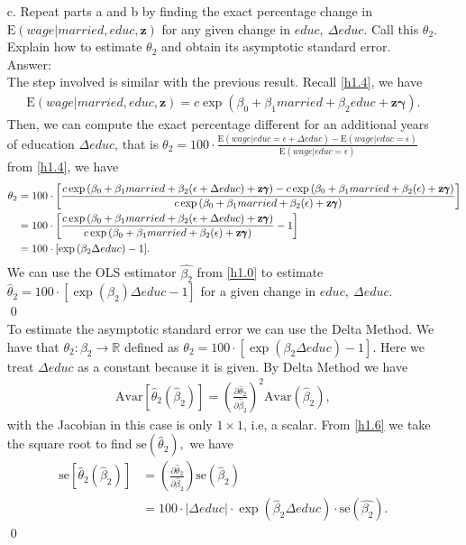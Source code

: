 \documentclass[10pt]{article}
\newcommand{\E}{\text{E}}
\newcommand{\Av}{\text{Avar}}
\newcommand{\se}{\text{se}}
\begin{document}
\begin{enumerate}
\item[c.] Repeat parts a and b by finding the exact percentage change in $\E(wage|married,educ,\mathbf{z})$ for any given change in $educ,\ \Delta educ.$ Call this $\theta_2.$ Explain how to estimate $\theta_2$ and obtain its asymptotic standard error.
\\ Answer:\\
The step involved is similar with the previous result. Recall \eqref{h1.4}, we have
\begin{align*}
    \E(wage|married,educ,\mathbf{z})=c\exp{(\beta_0+\beta_1 married +\beta_2 educ+\mathbf{z}\pmb{\gamma})}.
\end{align*}
Then, we can compute the exact percentage different for an additional years of education $\Delta educ$, that is $\theta_2=100\cdot\frac{\E(wage|educ=\epsilon+\Delta educ)-\E(wage|educ=\epsilon)}{\E(wage|educ=\epsilon)}$ from \eqref{h1.4}, we have
\begin{align}
    \theta_2&=100\cdot\left[\frac{c\exp{(\beta_0+\beta_1 married +\beta_2 (\epsilon+ \Delta educ)+\mathbf{z}\pmb{\gamma})}-c\exp{(\beta_0+\beta_1 married +\beta_2 (\epsilon)+\mathbf{z}\pmb{\gamma})}}{c\exp{(\beta_0+\beta_1 married +\beta_2 (\epsilon)+\mathbf{z}\pmb{\gamma})}}\right] \notag \\
    &=100\cdot\left[\frac{c\exp{(\beta_0+\beta_1 married +\beta_2 (\epsilon+ \Delta educ)+\mathbf{z}\pmb{\gamma})}}{c\exp{(\beta_0+\beta_1 married +\beta_2 (\epsilon)+\mathbf{z}\pmb{\gamma})}}-1\right] \notag \\
    &=100\cdot[\exp{(\beta_2\Delta educ)}-1]. \notag
\end{align} 
We can use the OLS estimator $\hat{\beta_2}$ from \eqref{h1.0} to estimate $\hat{\theta}_2=100\cdot[\exp{(\beta_2)}\Delta educ-1]$ for a given change in $educ,\ \Delta educ.$ 
\\ \qed \\
To estimate the asymptotic standard error we can use the Delta Method. We have that $\theta_2:\beta_2\to\mathbb{R}$ defined as $\theta_2=100\cdot[\exp{(\beta_2\Delta educ)} -1].$ Here we treat $\Delta educ$ as a constant because it is given. By Delta Method we have
\begin{align}
    \Av[\hat{\theta}_2(\hat{\beta}_2)]=\left(\frac{\partial\hat{\theta}_2}{\partial \hat{\beta}_2} \right)^2 \Av(\hat{\beta}_2), \label{h1.6}
\end{align}
with the Jacobian in this case is only $1\times 1$, i.e, a scalar. From \eqref{h1.6} we take the square root to find $\se(\hat{\theta}_2),$ we have
\begin{align*}
    \se[\hat{\theta}_2(\hat{\beta}_2)]&=\left(\frac{\partial\hat{\theta}_2}{\partial \hat{\beta}_2} \right) \se(\hat{\beta}_2) \\
    &=100\cdot |\Delta educ| \cdot\exp(\hat{\beta}_2 \Delta educ)\cdot \se(\hat{\beta_2}).
\end{align*}\qed



\end{enumerate}
\end{document}
